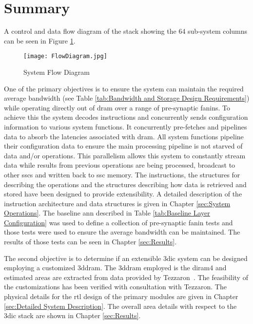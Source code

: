 \section{Summary}
\label{sec:Overview Summary}

A control and data flow diagram of the stack showing the 64 sub-system columns can be seen in Figure \ref{fig:FlowDiagram}.
\begin{figure}[!t]
\centering
\captionsetup{justification=centering}
\centerline{
\mbox{\texttt{[image: FlowDiagram.jpg]}}
}
\caption{System Flow Diagram}
\label{fig:FlowDiagram}
\end{figure}


One of the primary objectives is to ensure the system can maintain the required average bandwidth (see Table \ref{tab:Bandwidth and Storage Design Requirements}) while operating directly out of \ac{dram} over a range of pre-synaptic fanins.
To achieve this the system decodes instructions and concurrently sends configuration information to various system functions.
It concurrently pre-fetches and pipelines data to absorb the latencies associated with \ac{dram}.
All system functions pipeline their configuration data to ensure the main processing pipeline is not starved of data and/or operations.
This parallelism allows this system to constantly stream data while results from previous operations are being processed, broadcast to other \acp{ssc} and written back to \ac{ssc} memory.
The instructions, the structures for describing the operations and the structures describing how data is retrieved and stored have been designed to provide extensibility.
A detailed description of the instruction architecture and data structures is given in Chapter \ref{sec:System Operations}.
The baseline \ac{ann} described in Table \ref{tab:Baseline Layer Configuration} was used to define a collection of pre-synaptic fanin tests and those tests were used to ensure the average bandwidth can be maintained.
The results of those tests can be seen in Chapter \ref{sec:Results}.


The second objective is to determine if an extensible \ac{3dic} system can be designed employing a customized \ac{3ddram}.
The \ac{3ddram} employed is the \ac{diram4} and estimated areas are extracted from data provided by Tezzaron\textregistered~\cite{patti2014}.
The feasibility of the customizations has been verified with consultation with Tezzaron\textregistered.
The physical details for the \ac{rtl} design of the primary modules are given in Chapter \ref{sec:Detailed System Description}.
The overall area details with respect to the \ac{3dic} stack are shown in Chapter \ref{sec:Results}.



